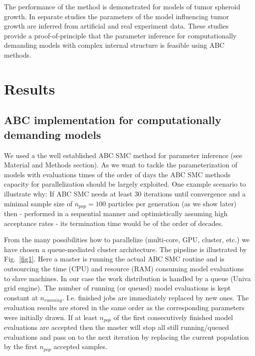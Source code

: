 \documentclass[10pt,letterpaper]{article}
\begin{document}
The performance of the method is demonstrated for models of tumor spheroid growth. In separate studies the parameters of the model influencing tumor growth are inferred from artificial and real experiment data. These studies provide a proof-of-principle that the parameter inference for computationally demanding models with complex internal structure is feasible using ABC methods.

\section*{Results}

\subsection*{ABC implementation for computationally demanding models}
We used a the well established ABC SMC method for parameter inference (see Material and Methods section). As we want to tackle the parameterization of models with evaluations times of the order of days the ABC SMC methods capacity for parallelization should be largely exploited. One example scenario to illustrate why: If ABC SMC needs at least 30 iterations until convergence and a minimal sample size of $n_{pop} = 100$ particles per generation (as we show later) then - performed in a sequential manner and optimistically assuming high acceptance rates - its termination time would be of the order of decades.  

From the many possibilities how to parallelize (multi-core, GPU, cluster, etc.) we have chosen a queue-mediated cluster architecture. The pipeline is illustrated by Fig.~\ref{fig1}. Here a master is running the actual ABC SMC routine and is outsourcing the time (CPU) and resource (RAM) consuming model evaluations to slave machines. In our case the work distribution is handled by a queue (Univa grid engine). The number of running (or queued) model evaluations is kept constant at $n_{running}$. I.e. finished jobs are immediately replaced by new ones. The evaluation results are stored in the same order as the corresponding parameters were initially drawn. If at least $n_{pop}$ of the first consecutively finished model evaluations are accepted then the master will stop all still running/queued evaluations and pass on to the next iteration by replacing the current population by the first $n_{pop}$ accepted samples. 
\end{document}
